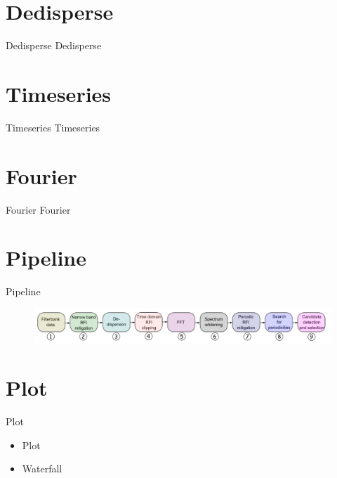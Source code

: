 \documentclass{beamer}
\begin{document}
\section{Dedisperse}
\begin{frame}{Dedisperse}
	Dedisperse
\end{frame}

\section{Timeseries}
\begin{frame}{Timeseries}
	Timeseries
\end{frame}

\section{Fourier}
\begin{frame}{Fourier}
	Fourier
\end{frame}

\section{Pipeline}
\begin{frame}{Pipeline}
	\begin{figure}
		\includegraphics[width=\textwidth]{pipeline-order}
	\end{figure}
\end{frame}

\section{Plot}
\begin{frame}{Plot}
	\begin{itemize}
		\item Plot
		\item Waterfall
	\end{itemize}
\end{frame}
\end{document}
